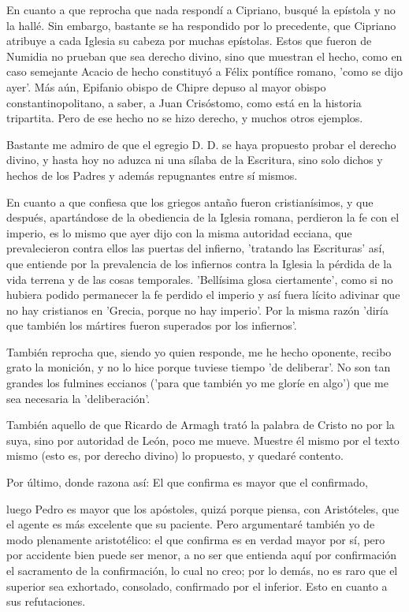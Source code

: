 En cuanto a que reprocha que nada respondí a Cipriano, busqué la epístola y no la hallé. Sin embargo, bastante se ha respondido por lo precedente, que Cipriano atribuye a cada Iglesia su cabeza por muchas epístolas. Estos que fueron de Numidia no prueban que sea derecho divino, sino que muestran el hecho, como en caso semejante Acacio de hecho constituyó a Félix pontífice romano, 'como se dijo ayer'. Más aún, Epifanio obispo de Chipre depuso al mayor obispo constantinopolitano, a saber, a Juan Crisóstomo, como está en la historia tripartita. Pero de ese hecho no se hizo derecho, y muchos otros ejemplos.

\marginpar{\small[277]} Bastante me admiro de que el egregio D. D. se haya propuesto probar el derecho divino, y hasta hoy no aduzca ni una sílaba de la Escritura, sino solo dichos y hechos de los Padres y además repugnantes entre sí mismos.

En cuanto a que confiesa que los griegos antaño fueron cristianísimos, y que después, apartándose de la obediencia de la Iglesia romana, perdieron la fe con el imperio, es lo mismo que ayer dijo con la misma autoridad ecciana, que prevalecieron contra ellos las puertas del infierno, 'tratando las Escrituras' así, que entiende por la prevalencia de los infiernos contra la Iglesia la pérdida de la vida terrena y de las cosas temporales. 'Bellísima glosa ciertamente', como si no hubiera podido permanecer la fe perdido el imperio y así fuera lícito adivinar que no hay cristianos en 'Grecia, porque no hay imperio'. Por la misma razón 'diría que también los mártires fueron superados por los infiernos'.

También reprocha que, siendo yo quien responde, me he hecho oponente, recibo grato la monición, y no lo hice porque tuviese tiempo 'de deliberar'. No son tan grandes los fulmines eccianos ('para que también yo me gloríe en algo') que me sea necesaria la 'deliberación'.

También aquello de que Ricardo de Armagh trató la palabra de Cristo no por la suya, sino por autoridad de León, poco me mueve. Muestre él mismo por el texto mismo (esto es, por derecho divino) lo propuesto, y quedaré contento.

Por último, donde razona así: El que confirma es mayor que el confirmado,

luego Pedro es mayor que los apóstoles, quizá porque piensa, con Aristóteles, que el agente es más excelente que su paciente. Pero argumentaré también yo de modo plenamente aristotélico: el que confirma es en verdad mayor por sí, pero por accidente bien puede ser menor, a no ser que entienda aquí por confirmación el sacramento de la confirmación, lo cual no creo; por lo demás, no es raro que el superior sea exhortado, consolado, confirmado por el inferior. Esto en cuanto a sus refutaciones.

